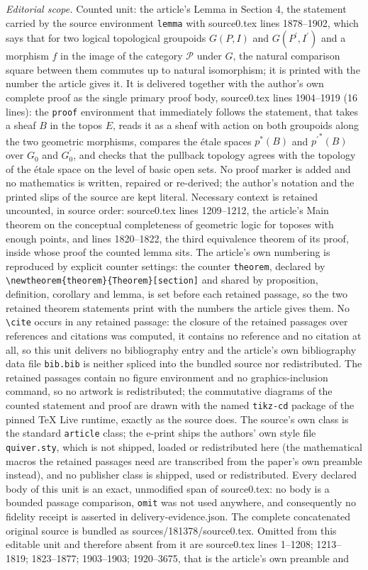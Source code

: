 \documentclass[10pt,a4paper]{amsart}
\newtheorem*{Notation Convention*}{Notation Convention}
\newcommand{\ca}[1]{\mathcal{#1}}
\begin{document}
\noindent\textit{Editorial scope.} Counted unit: the article's Lemma in Section 4, the statement carried by the source environment \texttt{lemma} with source0.tex lines 1878--1902, which says that for two logical topological groupoids $G(P,I)$ and $G(P^{\prime},I^{\prime})$ and a morphism $f$ in the image of the category $\ca{P}$ under $G$, the natural comparison square between them commutes up to natural isomorphism; it is printed with the number the article gives it. It is delivered together with the author's own complete proof as the single primary proof body, source0.tex lines 1904--1919 (16 lines): the \texttt{proof} environment that immediately follows the statement, that takes a sheaf $B$ in the topos $E$, reads it as a sheaf with action on both groupoids along the two geometric morphisms, compares the étale spaces $p^*(B)$ and ${p^{\prime}}^*(B)$ over $G_0$ and $G^{\prime}_0$, and checks that the pullback topology agrees with the topology of the étale space on the level of basic open sets. No proof marker is added and no mathematics is written, repaired or re-derived; the author's notation and the printed slips of the source are kept literal. Necessary context is retained uncounted, in source order: source0.tex lines 1209--1212, the article's Main theorem on the conceptual completeness of geometric logic for toposes with enough points, and lines 1820--1822, the third equivalence theorem of its proof, inside whose proof the counted lemma sits. The article's own numbering is reproduced by explicit counter settings: the counter \texttt{theorem}, declared by \texttt{\textbackslash newtheorem\{theorem\}\{Theorem\}[section]} and shared by proposition, definition, corollary and lemma, is set before each retained passage, so the two retained theorem statements print with the numbers the article gives them. No \texttt{\textbackslash cite} occurs in any retained passage: the closure of the retained passages over references and citations was computed, it contains no reference and no citation at all, so this unit delivers no bibliography entry and the article's own bibliography data file \texttt{bib.bib} is neither spliced into the bundled source nor redistributed. The retained passages contain no figure environment and no graphics-inclusion command, so no artwork is redistributed; the commutative diagrams of the counted statement and proof are drawn with the named \texttt{tikz-cd} package of the pinned TeX Live runtime, exactly as the source does. The source's own class is the standard \texttt{article} class; the e-print ships the authors' own style file \texttt{quiver.sty}, which is not shipped, loaded or redistributed here (the mathematical macros the retained passages need are transcribed from the paper's own preamble instead), and no publisher class is shipped, used or redistributed. Every declared body of this unit is an exact, unmodified span of source0.tex: no body is a bounded passage comparison, \texttt{omit} was not used anywhere, and consequently no fidelity receipt is asserted in delivery-evidence.json. The complete concatenated original source is bundled as sources/181378/source0.tex. Omitted from this editable unit and therefore absent from it are source0.tex lines 1--1208; 1213--1819; 1823--1877; 1903--1903; 1920--3675, that is the article's own preamble and 
\end{document}
